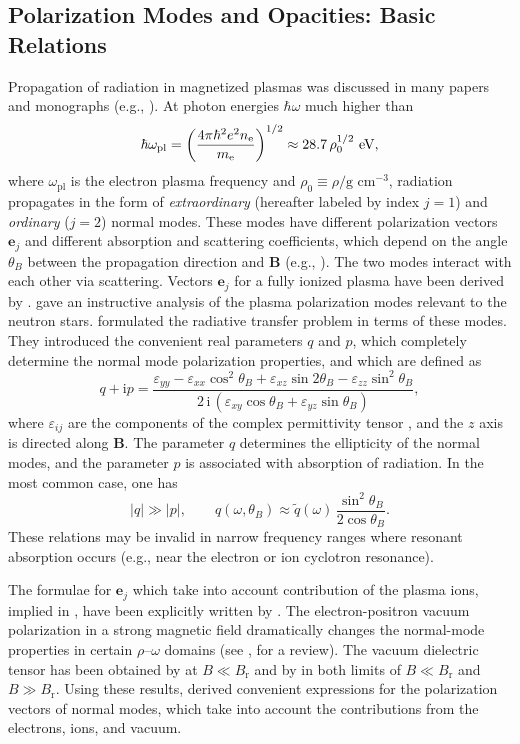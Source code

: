 \documentclass{emulateapj}
\newcommand{\gcc}{\mbox{g cm$^{-3}$}}
\newcommand{\beq}{\begin{equation}}
\newcommand{\eeq}{\end{equation}}
\newcommand{\mel}{m_\mathrm{e}}
\begin{document}
       \subsection{Polarization Modes and Opacities: Basic Relations}
\label{sect-opac-basic}
%
Propagation of radiation in magnetized plasmas
was discussed in many 
papers and monographs (e.g., \citealp{Ginzburg}).
At photon energies $\hbar\omega$ much higher than
\beq
   \hbar\omega_\mathrm{pl} =\left({4\pi\hbar^2 e^2 n_\mathrm{e} 
                      \over \mel} \right)^{1/2}
                      \approx 28.7\,\rho_0^{1/2}  \mathrm{~eV},
\label{plafreqe}
\eeq
where  $\omega_\mathrm{pl}$ is the electron plasma frequency
and $\rho_0\equiv\rho/\gcc$,
radiation propagates in the form of \emph{extraordinary}
(hereafter labeled by index $j=1$)
and \emph{ordinary} ($j=2$) normal modes.
These modes have different polarization vectors
$\bm{e}_j$
and different absorption and scattering
coefficients, which depend on the angle $\theta_B$
between the propagation direction and $\bm{B}$
(e.g., \citealp*{Kam82}).
The two modes interact with each other via scattering.
Vectors $\bm{e}_j$ for a fully ionized plasma
have been derived by \citet{Shafranov}.
\citet{Ventura79} gave
an instructive analysis of the plasma polarization modes
 relevant to the neutron stars.
\citet{GP73} formulated the radiative transfer
problem in terms of these modes.
They introduced the convenient real parameters $q$ and $p$,
which completely determine the normal mode polarization properties,
and which are defined as
\beq
   q+\mathrm{i}p=\frac{
   \varepsilon_{yy}-\varepsilon_{xx}\cos^2\theta_B
   +\varepsilon_{xz}\sin 2\theta_B
      -\varepsilon_{zz}\sin^2\theta_B
   }{
   2\,\mathrm{i}\,(\varepsilon_{xy}\cos\theta_B
   +\varepsilon_{yz}\sin\theta_B)},
\eeq
where $\varepsilon_{ij}$ are the components of the complex
permittivity tensor \citep{Ginzburg},
and the $z$ axis is directed along $\bm{B}$. The parameter $q$
determines the ellipticity of the normal modes,
and the parameter $p$ is associated with absorption of radiation.
In the most common case, one has 
\beq
   |q|\gg|p|,
 \qquad
  q(\omega,\theta_B)\approx \tilde{q}(\omega)\,
  \frac{\sin^2\theta_B}{2\cos\theta_B}.
\label{qp}
\eeq
These relations may be invalid in narrow frequency ranges
where resonant absorption occurs (e.g., near the 
electron or ion cyclotron resonance).

The formulae for $\bm{e}_j$ which take into account
contribution of the plasma ions, implied
in \citet{Shafranov},
have been explicitly written by
\citet{HoLai}. 
The electron-positron vacuum polarization in a strong magnetic field
dramatically changes the normal-mode properties
in certain $\rho$--$\omega$ domains
(see \citealp{PavlovGnedin}, for a review).
The vacuum dielectric tensor 
has been obtained by \citet{Adler}
at $B\ll B_\mathrm{r}$ and by \citet{HH97a,HH97b}
in both limits of $B\ll B_\mathrm{r}$ and $B\gg B_\mathrm{r}$.
Using these results,
\citet{HoLai02} derived convenient expressions
for the polarization vectors of normal modes, which take into account
the contributions from the electrons, ions, and vacuum.
\end{document}
